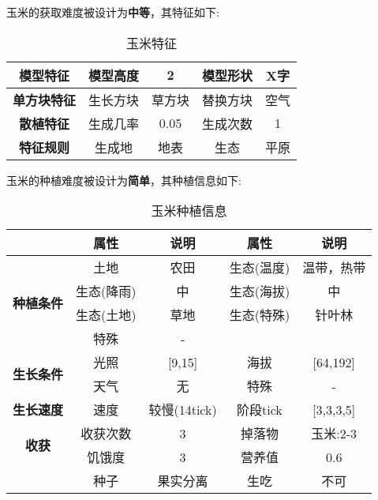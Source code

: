 玉米的获取难度被设计为\textbf{中等}，其特征如下:
\begin{table}[H]
    \centering
    \caption{玉米特征}
    \label{table:玉米特征}
    \setlength{\tabcolsep}{4mm}
    \begin{tabular}{c|cc|cc}
        \toprule
        \textbf{模型特征}   & 模型高度 & 2      & 模型形状 & X字  \\
        \midrule
        \textbf{单方块特征} & 生长方块 & 草方块 & 替换方块 & 空气 \\
        \midrule
        \textbf{散植特征}   & 生成几率 & 0.05   & 生成次数 & 1    \\
        \midrule
        \textbf{特征规则}   & 生成地   & 地表   & 生态     & 平原 \\
        \bottomrule
    \end{tabular}
\end{table}


玉米的种植难度被设计为\textbf{简单}，其种植信息如下:

\begin{table}[H]
    \centering
    \caption{玉米种植信息}
    \label{table:玉米种植信息}
    \setlength{\tabcolsep}{4mm}
    \begin{tabular}{c|cc|cc}
        \toprule
                                           & \textbf{属性} & \textbf{说明} & \textbf{属性} & \textbf{说明} \\
        \midrule
        \multirow{4}{*}{\textbf{种植条件}} & 土地          & 农田          & 生态(温度)    & 温带，热带    \\
                                           & 生态(降雨)    & 中            & 生态(海拔)    & 中            \\
                                           & 生态(土地)    & 草地          & 生态(特殊)    & 针叶林        \\
                                           & 特殊          & -                                             \\
        \midrule
        \multirow{2}{*}{\textbf{生长条件}} & 光照          & [9,15]        & 海拔          & [64,192]      \\
                                           & 天气          & 无            & 特殊          & -             \\
        \midrule
        \textbf{生长速度}                  & 速度          & 较慢(14tick)  & 阶段tick      & [3,3,3,5]     \\
        \midrule
        \multirow{2}{*}{\textbf{收获}}     & 收获次数      & 3             & 掉落物        & 玉米:2-3      \\
                                           & 饥饿度        & 3             & 营养值        & 0.6           \\
                                           & 种子          & 果实分离      & 生吃          & 不可          \\
        \bottomrule
    \end{tabular}
\end{table}

